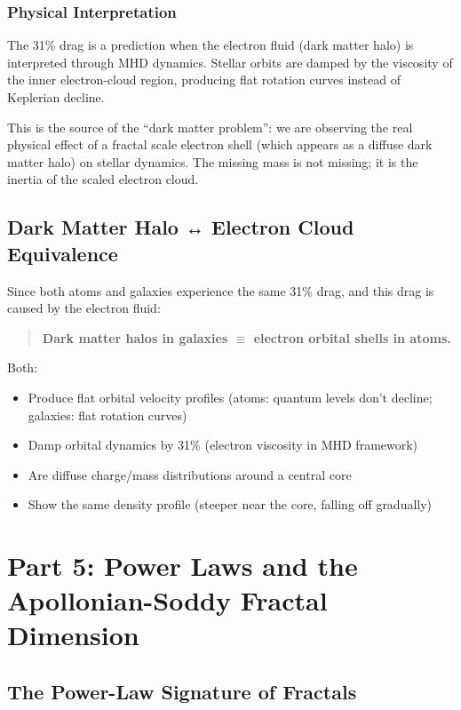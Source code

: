 \documentclass[11pt,a4paper]{article}
\begin{document}
\subsubsection{Physical Interpretation}

The 31\% drag is a prediction when the electron fluid (dark matter halo) is interpreted through MHD dynamics. Stellar orbits are damped by the viscosity of the inner electron-cloud region, producing flat rotation curves instead of Keplerian decline.

This is the source of the ``dark matter problem'': we are observing the real physical effect of a fractal scale electron shell (which appears as a diffuse dark matter halo) on stellar dynamics. The missing mass is not missing; it is the inertia of the scaled electron cloud.

\subsection{Dark Matter Halo ↔ Electron Cloud Equivalence}

Since both atoms and galaxies experience the same 31\% drag, and this drag is caused by the electron fluid:

\begin{quote}
\textbf{Dark matter halos in galaxies $\equiv$ electron orbital shells in atoms.}
\end{quote}

Both:
\begin{itemize}
\item Produce flat orbital velocity profiles (atoms: quantum levels don't decline; galaxies: flat rotation curves)
\item Damp orbital dynamics by 31\% (electron viscosity in MHD framework)
\item Are diffuse charge/mass distributions around a central core
\item Show the same density profile (steeper near the core, falling off gradually)
\end{itemize}

\section{Part 5: Power Laws and the Apollonian-Soddy Fractal Dimension}

\subsection{The Power-Law Signature of Fractals}
\end{document}
